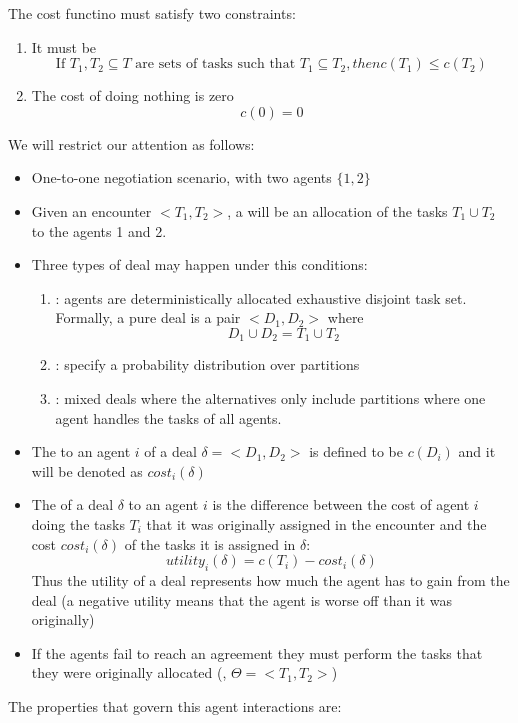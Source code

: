 The cost functino must satisfy two constraints:
\begin{enumerate}
\item It must be 
\[\text{If } T_1, T_2 \subseteq T \text{ are sets of tasks such that } T_1\subseteq T_2, then c(T_1) \le c(T_2)\]
\item The cost of doing nothing is zero
\[c(0) =0\]
\end{enumerate}

We will restrict our attention as follows:
\begin{itemize}
\item One-to-one negotiation scenario, with two agents $\{1,2\}$
\item Given an encounter $< T_1, T_2>$, a  will be an allocation of the tasks $T_1 \cup T_2$ to the agents 1 and 2.
\item Three types of deal may happen under this conditions:
\begin{enumerate}
\item {}: agents are deterministically allocated exhaustive disjoint task set.\\
Formally, a pure deal is a pair $< D_1, D_2>$ where 
\[D_1 \cup D_2 = T_1 \cup T_2\]
\item {}: specify a probability distribution over partitions
\item {}: mixed deals where the alternatives only include partitions where one agent handles the tasks of all agents.
\end{enumerate}
\item The  to an agent $i$ of a deal $\delta = <D_1, D_2>$ is defined to be $c(D_i)$ and it will  be denoted as $cost_i(\delta)$
\item The  of a deal $\delta$ to an agent $i$ is the difference between the cost of agent $i$ doing the tasks $T_i$ that it was originally assigned in the encounter and the cost $cost_i(\delta)$ of the tasks it is assigned in $\delta$:
\[utility_i(\delta) = c(T _i) - cost_i(\delta)\]
Thus the utility of a deal represents how much the agent has to gain from the deal (a negative utility means that the agent is worse off than it was originally)
\item If the agents fail to reach an agreement they must perform the tasks that they were originally allocated (, $\Theta = <T_1, T_2>$) 
\end{itemize} 
The properties that govern this agent interactions are:
